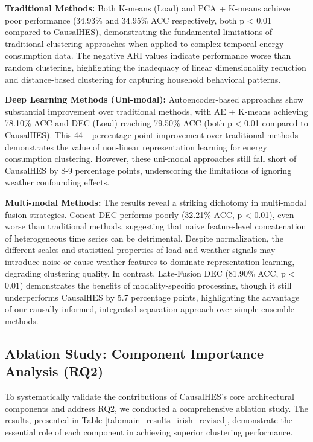 \documentclass[journal]{IEEEtran}
\begin{document}
\textbf{Traditional Methods:} Both K-means (Load) and PCA + K-means achieve poor performance (34.93\% and 34.95\% ACC respectively, both p < 0.01 compared to CausalHES), demonstrating the fundamental limitations of traditional clustering approaches when applied to complex temporal energy consumption data. The negative ARI values indicate performance worse than random clustering, highlighting the inadequacy of linear dimensionality reduction and distance-based clustering for capturing household behavioral patterns.

\textbf{Deep Learning Methods (Uni-modal):} Autoencoder-based approaches show substantial improvement over traditional methods, with AE + K-means achieving 78.10\% ACC and DEC (Load) reaching 79.50\% ACC (both p < 0.01 compared to CausalHES). This 44+ percentage point improvement over traditional methods demonstrates the value of non-linear representation learning for energy consumption clustering. However, these uni-modal approaches still fall short of CausalHES by 8-9 percentage points, underscoring the limitations of ignoring weather confounding effects.

\textbf{Multi-modal Methods:} The results reveal a striking dichotomy in multi-modal fusion strategies. Concat-DEC performs poorly (32.21\% ACC, p < 0.01), even worse than traditional methods, suggesting that naive feature-level concatenation of heterogeneous time series can be detrimental. Despite normalization, the different scales and statistical properties of load and weather signals may introduce noise or cause weather features to dominate representation learning, degrading clustering quality. In contrast, Late-Fusion DEC (81.90\% ACC, p < 0.01) demonstrates the benefits of modality-specific processing, though it still underperforms CausalHES by 5.7 percentage points, highlighting the advantage of our causally-informed, integrated separation approach over simple ensemble methods.

\subsection{Ablation Study: Component Importance Analysis (RQ2)}
\label{sec:ablation_study_results}

To systematically validate the contributions of CausalHES's core architectural components and address RQ2, we conducted a comprehensive ablation study. The results, presented in Table \ref{tab:main_results_irish_revised}, demonstrate the essential role of each component in achieving superior clustering performance.
\end{document}
